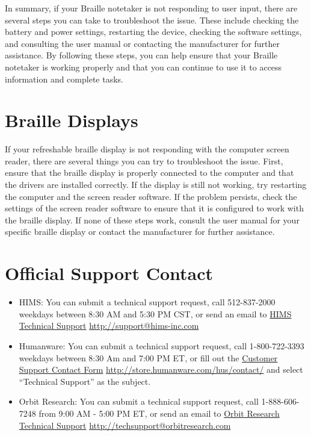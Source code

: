 \documentclass[12pt,letterpaper,twoside]{extreport}
\begin{document}
\begin{appendices}
In summary, if your Braille notetaker is not responding to user input, there are several steps you can take to troubleshoot the issue. These include checking the battery and power settings, restarting the device, checking the software settings, and consulting the user manual or contacting the manufacturer for further assistance. By following these steps, you can help ensure that your Braille notetaker is working properly and that you can continue to use it to access information and complete tasks.  
\hypertarget{display2}{}\section{Braille Displays}\label{display2}
If your refreshable braille display is not responding with the computer screen reader, there are several things you can try to troubleshoot the issue. First, ensure that the braille display is properly connected to the computer and that the drivers are installed correctly. If the display is still not working, try restarting the computer and the screen reader software. If the problem persists, check the settings of the screen reader software to ensure that it is configured to work with the braille display. If none of these steps work, consult the user manual for your specific braille display or contact the manufacturer for further assistance.
\hypertarget{report2}{}\section{Official Support Contact}\label{report2}
\begin{itemize}[leftmargin=*]
\item HIMS: You can submit a technical support request, call 512-837-2000 weekdays between 8:30 AM and 5:30 PM CST, or send an email to \href{http://support@hims-inc.com}{HIMS Technical Support}  \break\url{http://support@hims-inc.com}
\item Humanware: You can submit a technical support request, call 1-800-722-3393 weekdays between 8:30 Am and 7:00 PM ET, or fill out the \href{http://store.humanware.com/hus/contact/}{Customer Support Contact Form}  \break\url{http://store.humanware.com/hus/contact/} and select ``Technical Support'' as the subject. 
\item Orbit Research: You can submit a technical support request, call 1-888-606-7248 from 9:00 AM - 5:00 PM ET, or send an email to \href{http://techsupport@orbitresearch.com}{Orbit Research Technical Support}  \break\url{http://techsupport@orbitresearch.com}

\end{itemize}
\end{appendices}
\end{document}
